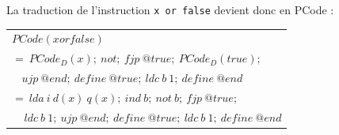 \documentclass[french,11pt,twoside]{article}
\begin{document}
La traduction de l'instruction \texttt{x or false} devient donc en PCode :
\\

\begin{tabular}{l}
$PCode(x or false)$ \\
\hspace{1cm} $=\ PCode_D(x);\ not;\ fjp\ @true;\ PCode_D(true);$\\
\hspace{1cm} $\ \ \ \ ujp\ @end;\ define\ @true;\ ldc\ b\ 1;\ define\ @end$\\
\hspace{1cm} $=\ lda\ i\ d(x)\ q(x);\ ind\ b;\ not\ b;\ fjp\ @true;$\\
\hspace{1cm}$\ \ \ \ \ ldc\ b\ 1;\ ujp\ @end;\ define\ @true;\ ldc\ b\ 1;\ define\ @end$\\
\end{tabular}
\end{document}
